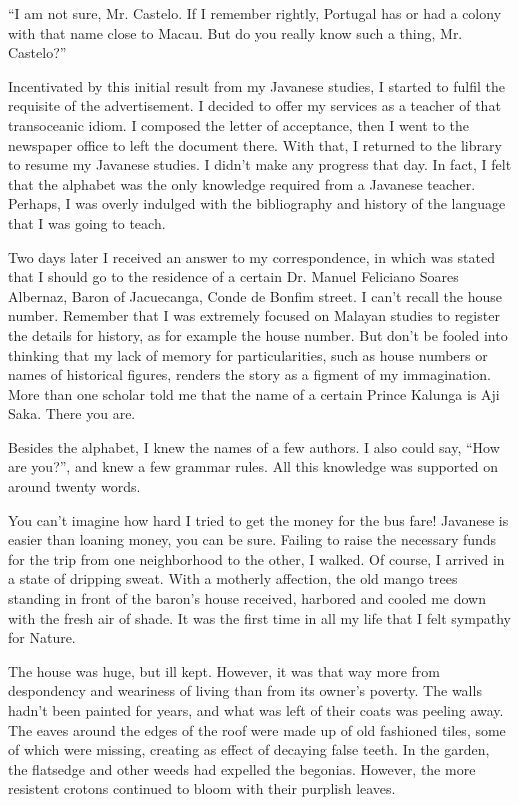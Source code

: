 \documentclass[a4paper,12pt]{book}
\begin{document}
``I am not sure, Mr. Castelo. If I remember rightly,
Portugal has or had a colony with that name
close to Macau. But do you
really know such a thing, Mr. Castelo?''

Incentivated by this initial result from
my Javanese studies,
I started to fulfil the requisite of the advertisement.
I decided to offer my services as a teacher of
that transoceanic idiom. I composed the letter of
acceptance, then I went to the newspaper
office to left the document there.
With that, I returned
to the library to resume my Javanese studies.
I didn't make any progress that day. In fact, I
felt that the alphabet was the only knowledge
required from a Javanese teacher. Perhaps,
I was overly indulged with the
bibliography and history of the
language that I was going to teach.

Two days later I received an answer to my correspondence,
in which was stated
that I should go to the residence of
a certain Dr. Manuel Feliciano Soares Albernaz,
Baron of Jacuecanga,
Conde de Bonfim street.
I can't recall the house
number. Remember that  I was extremely focused
on Malayan studies to register the details
for history, as for example the house number.
But don't be fooled into thinking that
my lack of memory for particularities,
such as house numbers or names of historical
figures, renders the story as a figment
of my immagination. More than one scholar
told me that the  name of a certain
Prince Kalunga 
is Aji Saka. 
There you are.

Besides the alphabet, I knew the names
of a few authors. I also could say, ``How are
you?'', and knew a few grammar rules.
All this knowledge was supported
on around twenty words.

You can't imagine how hard I tried
to get the money for the bus fare! Javanese
is easier than loaning money,
you can be sure. Failing to raise
the necessary funds for the trip from
one neighborhood to the other, I walked.
Of course, I arrived in a state of dripping sweat.
With a motherly
affection, the old
mango trees standing in front
of the baron's house received, harbored
and cooled me down with the fresh air of shade.
It was the first time in all my life
that I felt sympathy for Nature.

The house was huge, but ill kept.
However, it was that way more from
despondency and weariness of living
than from its owner's poverty.
The walls hadn't been
painted for years, and what was left
of their coats was peeling away.
The eaves around the edges of the
roof were made up of old fashioned tiles,
some of which were missing, creating
as effect of decaying false teeth.
In the garden, the
flatsedge and other weeds had expelled the 
begonias. However, the more resistent crotons
continued to bloom with their purplish leaves.
\end{document}
